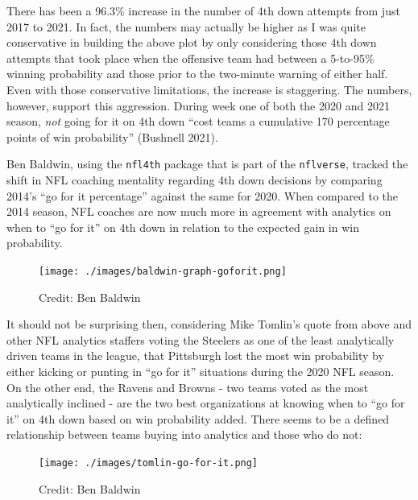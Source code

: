 \documentclass[
  letterpaper,
]{krantz}
\begin{document}
There has been a 96.3\% increase in the number of 4th down attempts from
just 2017 to 2021. In fact, the numbers may actually be higher as I was
quite conservative in building the above plot by only considering those
4th down attempts that took place when the offensive team had between a
5-to-95\% winning probability and those prior to the two-minute warning
of either half. Even with those conservative limitations, the increase
is staggering. The numbers, however, support this aggression. During
week one of both the 2020 and 2021 season, \emph{not} going for it on
4th down ``cost teams a cumulative 170 percentage points of win
probability'' (Bushnell 2021).

Ben Baldwin, using the \texttt{nfl4th} package that is part of the
\texttt{nflverse}, tracked the shift in NFL coaching mentality regarding
4th down decisions by comparing 2014's ``go for it percentage'' against
the same for 2020. When compared to the 2014 season, NFL coaches are now
much more in agreement with analytics on when to ``go for it'' on 4th
down in relation to the expected gain in win probability.

\begin{figure}

{\centering \texttt{[image: ./images/baldwin-graph-goforit.png]}

}

\caption{Credit: Ben Baldwin}

\end{figure}

It should not be surprising then, considering Mike Tomlin's quote from
above and other NFL analytics staffers voting the Steelers as one of the
least analytically driven teams in the league, that Pittsburgh lost the
most win probability by either kicking or punting in ``go for it''
situations during the 2020 NFL season. On the other end, the Ravens and
Browns - two teams voted as the most analytically inclined - are the two
best organizations at knowing when to ``go for it'' on 4th down based on
win probability added. There seems to be a defined relationship between
teams buying into analytics and those who do not:

\begin{figure}

{\centering \texttt{[image: ./images/tomlin-go-for-it.png]}

}

\caption{Credit: Ben Baldwin}

\end{figure}
\end{document}

